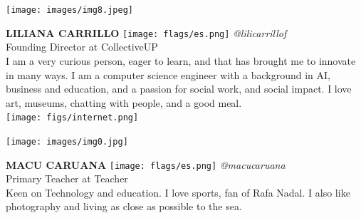 \documentclass[11pt]{article}
\begin{document}
\noindent
\begin{minipage}{0.3\textwidth}
\centering
\texttt{[image: images/img8.jpeg]}
\end{minipage}
\hfill
\begin{minipage}{0.6\textwidth}\raggedright
\color{color1}\uppercase{\textbf{Liliana Carrillo}}
\color{color2}\hspace{0.2cm}\texttt{[image: flags/es.png]}
\hspace{0.2cm}\textit{@lilicarrillof}
\\
Founding Director at CollectiveUP\\
{\footnotesize I am a very curious person, eager to learn, and that has brought me to innovate in many ways.  I am a computer science engineer with a background in AI, business and education, and a passion for social work, and social impact.  I love art, museums, chatting with people, and a good meal.}\\
\texttt{[image: figs/internet.png]}
\end{minipage}
\newline\newline\newline

\noindent
\begin{minipage}{0.3\textwidth}
\centering
\texttt{[image: images/img0.jpg]}
\end{minipage}
\hfill
\begin{minipage}{0.6\textwidth}\raggedright
\color{color1}\uppercase{\textbf{Macu Caruana}}
\color{color2}\hspace{0.2cm}\texttt{[image: flags/es.png]}
\hspace{0.2cm}\textit{@macucaruana}
\\
Primary Teacher at Teacher\\
{\footnotesize Keen on Technology and education. I love sports, fan of Rafa Nadal. I also like photography and living as close as possible to the sea.}\\
\end{minipage}
\newline\newline\newline
\end{document}
